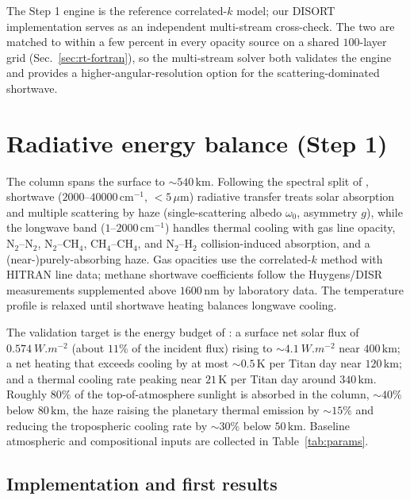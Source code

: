 \documentclass[11pt]{article}
\begin{document}
\noindent The Step 1 engine is the reference correlated-$k$ model; our DISORT
implementation serves as an independent multi-stream cross-check. The two are
matched to within a few percent in every opacity source on a shared
$100$-layer grid (Sec.~\ref{sec:rt-fortran}), so the multi-stream solver both
validates the engine and provides a higher-angular-resolution option for the
scattering-dominated shortwave.

\section{Radiative energy balance (Step 1)}
\label{sec:rt}

The column spans the surface to $\sim\!540\,\mathrm{km}$. Following the spectral
split of \citet{Lombardo2023}, shortwave ($2000$--$40000\,\mathrm{cm^{-1}}$,
$<5\,\mu\mathrm{m}$) radiative transfer treats solar absorption and multiple
scattering by haze (single-scattering albedo $\omega_0$, asymmetry $g$), while
the longwave band ($1$--$2000\,\mathrm{cm^{-1}}$) handles thermal cooling with
gas line opacity, $\mathrm{N_2}$--$\mathrm{N_2}$,
$\mathrm{N_2}$--$\mathrm{CH_4}$, $\mathrm{CH_4}$--$\mathrm{CH_4}$, and
$\mathrm{N_2}$--$\mathrm{H_2}$ collision-induced absorption, and a
(near-)purely-absorbing haze. Gas opacities use the correlated-$k$ method with
HITRAN line data; methane shortwave coefficients follow the Huygens/DISR
measurements supplemented above $1600\,\mathrm{nm}$ by laboratory data. The
temperature profile is relaxed until shortwave heating balances longwave cooling.

The validation target is the energy budget of \citet{Tomasko2008heat}: a surface
net solar flux of $\SI{0.574}{W.m^{-2}}$ (about $11\%$ of the incident flux)
rising to $\sim\!\SI{4.1}{W.m^{-2}}$ near $400\,\mathrm{km}$; a net heating that
exceeds cooling by at most $\sim\!0.5\,\mathrm{K}$ per Titan day near
$120\,\mathrm{km}$; and a thermal cooling rate peaking near
$21\,\mathrm{K}$ per Titan day around $340\,\mathrm{km}$. Roughly $80\%$ of the
top-of-atmosphere sunlight is absorbed in the column, $\sim\!40\%$ below
$80\,\mathrm{km}$, the haze raising the planetary thermal emission by $\sim\!15\%$
and reducing the tropospheric cooling rate by $\sim\!30\%$ below
$50\,\mathrm{km}$. Baseline atmospheric and compositional inputs are collected in
Table~\ref{tab:params}.

\subsection{Implementation and first results}
\label{sec:rt-impl}
\end{document}
